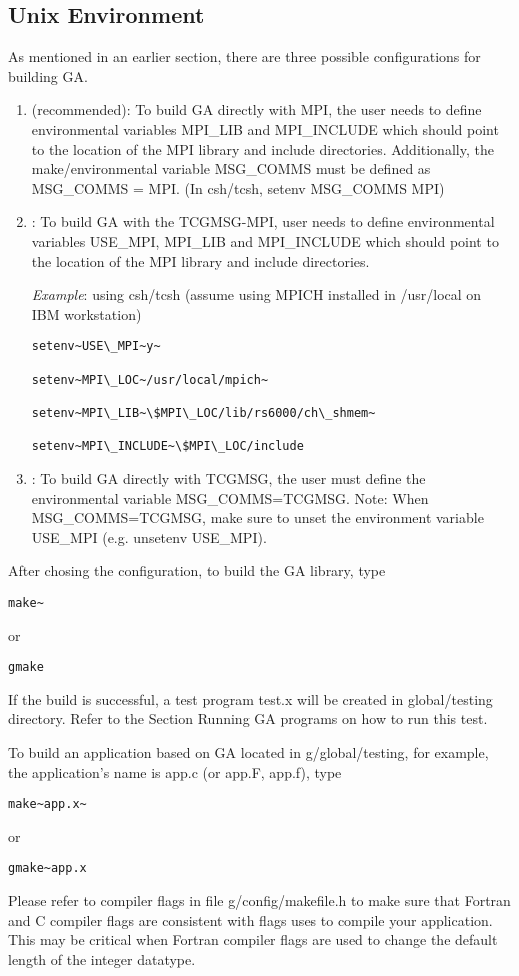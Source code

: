 \subsection{Unix Environment }

As mentioned in an earlier section, there are three possible configurations
for building GA.
\begin{enumerate}
\item \textcolor{black}{} (recommended): To build
GA directly with MPI, the user needs to define environmental variables
MPI\_LIB and MPI\_INCLUDE which should point to the location of the
MPI library and include directories. Additionally, the make/environmental
variable MSG\_COMMS must be defined as MSG\_COMMS = MPI. (In csh/tcsh,
setenv MSG\_COMMS MPI)
\item \textcolor{black}{}: To build GA with
the TCGMSG-MPI, user needs to define environmental variables USE\_MPI,
MPI\_LIB and MPI\_INCLUDE which should point to the location of the
MPI library and include directories.


\emph{Example}: using csh/tcsh (assume using MPICH installed in /usr/local
on IBM workstation)
\begin{verbatim}
setenv~USE\_MPI~y~

setenv~MPI\_LOC~/usr/local/mpich~

setenv~MPI\_LIB~\$MPI\_LOC/lib/rs6000/ch\_shmem~

setenv~MPI\_INCLUDE~\$MPI\_LOC/include
\end{verbatim}
\item \textcolor{black}{}: To build GA directly
with TCGMSG, the user must define the environmental variable MSG\_COMMS=TCGMSG.
Note: When MSG\_COMMS=TCGMSG, make sure to unset the environment variable
USE\_MPI (e.g. unsetenv USE\_MPI).
\end{enumerate}
After chosing the configuration, to build the GA library, type 
\begin{verbatim}
make~
\end{verbatim}
or 
\begin{verbatim}
gmake
\end{verbatim}
If the build is successful, a test program test.x will be created
in global/testing directory. Refer to the Section \textquotedbl{}Running
GA programs\textquotedbl{} on how to run this test.

To build an application based on GA located in g/global/testing, for
example, the application's name is app.c (or app.F, app.f), type 
\begin{verbatim}
make~app.x~
\end{verbatim}
or 
\begin{verbatim}
gmake~app.x
\end{verbatim}
Please refer to compiler flags in file g/config/makefile.h to make
sure that Fortran and C compiler flags are consistent with flags uses
to compile your application. This may be critical when Fortran compiler
flags are used to change the default length of the integer datatype.



